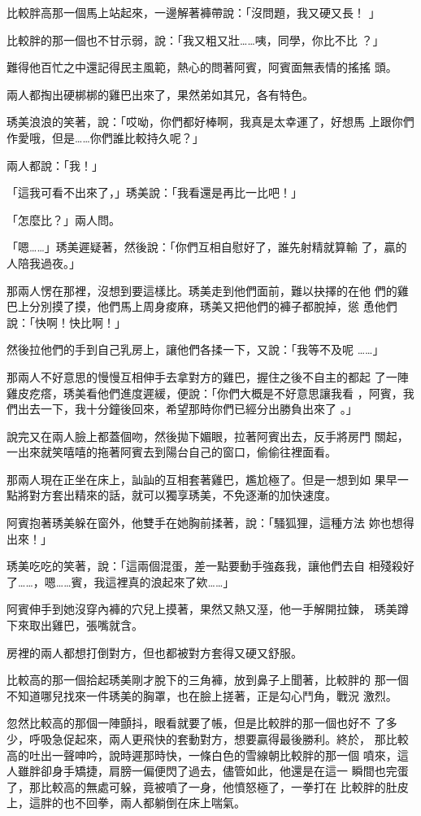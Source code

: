 比較胖高那一個馬上站起來，一邊解著褲帶說：「沒問題，我又硬又長！
」

比較胖的那一個也不甘示弱，說：「我又粗又壯……咦，同學，你比不比
？」

難得他百忙之中還記得民主風範，熱心的問著阿賓，阿賓面無表情的搖搖
頭。

兩人都掏出硬梆梆的雞巴出來了，果然弟如其兄，各有特色。

琇美浪浪的笑著，說：「哎呦，你們都好棒啊，我真是太幸運了，好想馬
上跟你們作愛哦，但是……你們誰比較持久呢？」

兩人都說：「我！」

「這我可看不出來了，」琇美說：「我看還是再比一比吧！」

「怎麼比？」兩人問。

「嗯……」琇美遲疑著，然後說：「你們互相自慰好了，誰先射精就算輸
了，贏的人陪我過夜。」

那兩人愣在那裡，沒想到要這樣比。琇美走到他們面前，難以抉擇的在他
們的雞巴上分別摸了摸，他們馬上周身痠麻，琇美又把他們的褲子都脫掉，慫
恿他們說：「快啊！快比啊！」

然後拉他們的手到自己乳房上，讓他們各揉一下，又說：「我等不及呢
……」

那兩人不好意思的慢慢互相伸手去拿對方的雞巴，握住之後不自主的都起
了一陣雞皮疙瘩，琇美看他們進度遲緩，便說：「你們大概是不好意思讓我看
，阿賓，我們出去一下，我十分鐘後回來，希望那時你們已經分出勝負出來了
。」

說完又在兩人臉上都蓋個吻，然後拋下媚眼，拉著阿賓出去，反手將房門
關起，一出來就笑嘻嘻的拖著阿賓去到陽台自己的窗口，偷偷往裡面看。

那兩人現在正坐在床上，訕訕的互相套著雞巴，尷尬極了。但是一想到如
果早一點將對方套出精來的話，就可以獨享琇美，不免逐漸的加快速度。

阿賓抱著琇美躲在窗外，他雙手在她胸前揉著，說：「騷狐狸，這種方法
妳也想得出來！」

琇美吃吃的笑著，說：「這兩個混蛋，差一點要動手強姦我，讓他們去自
相殘殺好了……，嗯……賓，我這裡真的浪起來了欸……」

阿賓伸手到她沒穿內褲的穴兒上摸著，果然又熱又溼，他一手解開拉鍊，
琇美蹲下來取出雞巴，張嘴就含。

房裡的兩人都想打倒對方，但也都被對方套得又硬又舒服。

比較高的那一個拾起琇美剛才脫下的三角褲，放到鼻子上聞著，比較胖的
那一個不知道哪兒找來一件琇美的胸罩，也在臉上搓著，正是勾心鬥角，戰況
激烈。

忽然比較高的那個一陣顫抖，眼看就要了帳，但是比較胖的那一個也好不
了多少，呼吸急促起來，兩人更飛快的套動對方，想要贏得最後勝利。終於，
那比較高的吐出一聲呻吟，說時遲那時快，一條白色的雪線朝比較胖的那一個
噴來，這人雖胖卻身手矯捷，肩膀一偏便閃了過去，儘管如此，他還是在這一
瞬間也完蛋了，那比較高的無處可躲，竟被噴了一身，他憤怒極了，一拳打在
比較胖的肚皮上，這胖的也不回拳，兩人都躺倒在床上喘氣。

